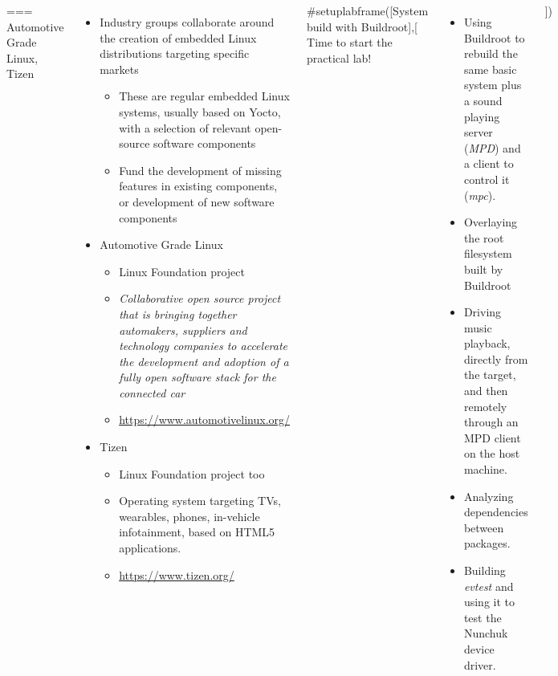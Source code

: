 \begin{columns}
=== {Automotive Grade Linux, Tizen}
  \begin{itemize}
  \item Industry groups collaborate around the creation of embedded
    Linux distributions targeting specific markets
    \begin{itemize}
    \item These are regular embedded Linux systems, usually based on
      Yocto, with a selection of relevant open-source software components
    \item Fund the development of missing features in existing
      components, or development of new software components
    \end{itemize}
  \item Automotive Grade Linux
    \begin{itemize}
    \item Linux Foundation project
    \item {\em Collaborative open source project that is bringing
        together automakers, suppliers and technology companies to
        accelerate the development and adoption of a fully open
        software stack for the connected car}
    \item \url{https://www.automotivelinux.org/}
    \end{itemize}
  \item Tizen
    \begin{itemize}
    \item Linux Foundation project too
    \item Operating system targeting TVs, wearables, phones, in-vehicle
          infotainment, based on HTML5 applications.
    \item \url{https://www.tizen.org/}
    \end{itemize}
  \end{itemize}


#setuplabframe([System build with Buildroot],[
  Time to start the practical lab!
  \begin{itemize}
  \item Using Buildroot to rebuild the same basic system plus a sound
    playing server ({\em MPD}) and a client to control it ({\em mpc}).
  \item Overlaying the root filesystem built by Buildroot
  \item Driving music playback, directly from the target, and then
    remotely through an MPD client on the host machine.
  \item Analyzing dependencies between packages.
  \item Building {\em evtest} and using it to test the Nunchuk
	device driver.
  \end{itemize}
])
\end{columns}
